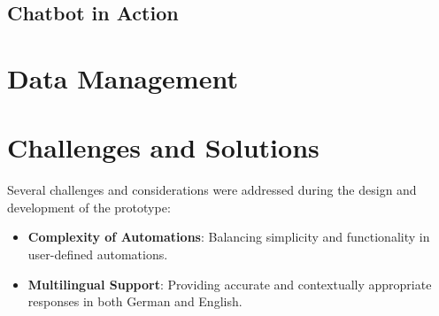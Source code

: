 \subsection{Chatbot in Action}
\section{Data Management}
\section{Challenges and Solutions}
Several challenges and considerations were addressed during the design and development of the prototype:

\begin{itemize}
\item \textbf{Complexity of Automations}: Balancing simplicity and functionality in user-defined automations.
\item \textbf{Multilingual Support}: Providing accurate and contextually appropriate responses in both German and English.
\end{itemize}
